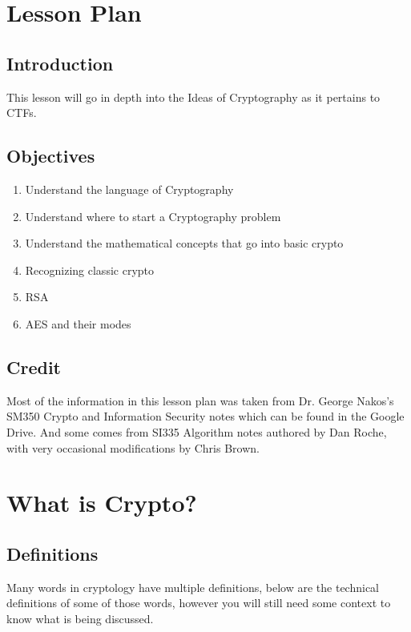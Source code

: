 \documentclass{report}
\begin{document}
\tableofcontents

\newpage

\chapter{Lesson Plan}
 
\section{Introduction}
This lesson will go in depth into the Ideas of Cryptography as it pertains to CTFs.
 
\section{Objectives}
 \begin{enumerate}
    \item Understand the language of Cryptography
    \item Understand where to start a Cryptography problem
    \item Understand the mathematical concepts that go into basic crypto 
    \item Recognizing classic crypto
    \item RSA
    \item AES and their modes
\end{enumerate}

\section{Credit}
Most of the information in this lesson plan was taken from Dr. George Nakos's SM350 Crypto and Information Security notes which can be found in the Google Drive.  And some comes from SI335 Algorithm notes authored by Dan Roche, with very occasional modifications by Chris Brown.

\newpage

\chapter{What is Crypto?}

\section{Definitions}
Many words in cryptology have multiple definitions, below are the technical definitions of some of those words, however you will still need some context to know what is being discussed.
\end{document}
